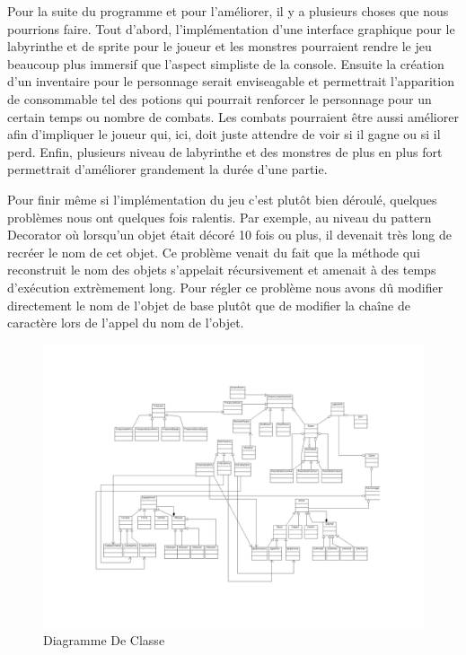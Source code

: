 \documentclass[a4paper]{article}
\begin{document}
Pour la suite du programme et pour l'améliorer, il y a plusieurs choses que nous pourrions faire.
Tout d'abord, l'implémentation d'une interface graphique pour le labyrinthe et de sprite pour le joueur et les monstres pourraient rendre le jeu beaucoup plus immersif
que l'aspect simpliste de la console. Ensuite la création d'un inventaire pour le personnage serait enviseagable et permettrait l'apparition de consommable tel des potions
qui pourrait renforcer le personnage pour un certain temps ou nombre de combats.
Les combats pourraient être aussi améliorer afin d'impliquer le joueur qui, ici, doit juste attendre de voir si il gagne ou si il perd.
Enfin, plusieurs niveau de labyrinthe et des monstres de plus en plus fort permettrait d'améliorer grandement la durée d'une partie.

Pour finir même si l'implémentation du jeu c'est plutôt bien déroulé, quelques problèmes nous ont quelques fois ralentis. Par exemple, au niveau du pattern Decorator
où lorsqu'un objet était décoré 10 fois ou plus, il devenait très long de recréer le nom de cet objet. Ce problème venait du fait que la méthode qui reconstruit le nom
des objets s'appelait récursivement et amenait à des temps d'exécution extrèmement long. Pour régler ce problème nous avons dû modifier directement le nom de l'objet de
base plutôt que de modifier la chaîne de caractère lors de l'appel du nom de l'objet.

\begin{figure}[h]
			\centering
				\includegraphics[angle=90,width=20cm]{./diagClasse.png}
			\caption{\label{fig:Diag}Diagramme De Classe}
			
		\end{figure}
\end{document}
